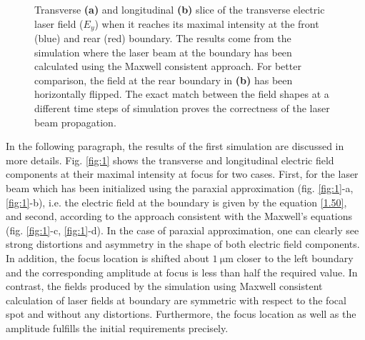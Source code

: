 \begin{figure}[h!]
	\centering
	\hspace{1mm}
	\caption{Transverse \textbf{(a)} and longitudinal \textbf{(b)} slice of the transverse electric laser field ($ E_{y} $) when it reaches its maximal intensity at the front (blue) and rear (red) boundary. The results come from the simulation where the laser beam at the boundary has been calculated using the Maxwell consistent approach. For better comparison, the field at the rear boundary in \textbf{(b)} has been horizontally flipped. The exact match between the field shapes at a different time steps of simulation proves the correctness of the laser beam propagation.}
	\label{fig:4}
\end{figure}

In the following paragraph, the results of the first simulation are discussed in more details. Fig. \ref{fig:1} shows the transverse and longitudinal electric field components at their maximal intensity at focus for two cases. First, for the laser beam which has been initialized using the paraxial approximation (fig. \ref{fig:1}-a, \ref{fig:1}-b), i.e. the electric field at the boundary is given by the equation \ref{1.50}, and second, according to the approach consistent with the Maxwell's equations (fig. \ref{fig:1}-c, \ref{fig:1}-d). In the case of paraxial approximation, one can clearly see strong distortions and asymmetry in the shape of both electric field components. In addition, the focus location is shifted about $ 1 \ \mathrm{\mu m} $ closer to the left boundary and the corresponding amplitude at focus is less than half the required value. In contrast, the fields produced by the simulation using Maxwell consistent calculation of laser fields at boundary are symmetric with respect to the focal spot and without any distortions. Furthermore, the focus location as well as the amplitude fulfills the initial requirements precisely.

